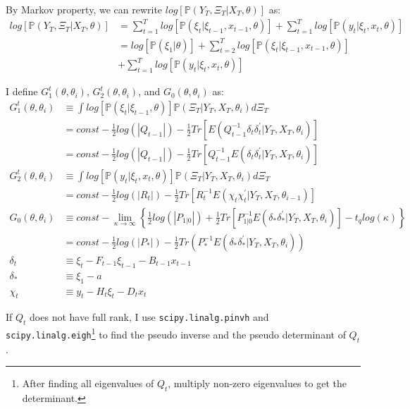 \documentclass[10pt]{article}
\numberwithin{equation}{section}
\begin{document}
By Markov property, we can rewrite $log[\mathbb{P}(Y_T,\Xi_T|X_T,\theta)]$ as:
\begin{align}
    log[\mathbb{P}(Y_T,\Xi_T|X_T,\theta)] &= \sum_{t=1}^{T}log[\mathbb{P}(\xi_t|\xi_{t-1},x_{t-1},\theta)] 
    + \sum_{t=1}^{T}log[\mathbb{P}(y_t|\xi_t,x_t,\theta)] \nonumber \\
    &= log[\mathbb{P}(\xi_1|\theta)] + \sum_{t=2}^{T}log[\mathbb{P}(\xi_t|\xi_{t-1},x_{t-1},\theta)] \nonumber \\ 
    &+ \sum_{t=1}^{T}log[\mathbb{P}(y_t|\xi_t,x_t,\theta)]\label{eq:log}
\end{align}

I define $G_1^{t}(\theta,\theta_i)$, $G_2^{t}(\theta,\theta_i)$, and $G_0(\theta,\theta_i)$ as:
\begin{align}
    G_1^{t}(\theta,\theta_{i}) &\equiv \int log[\mathbb{P}(\xi_t|\xi_{t-1},\theta)]\mathbb{P}(\Xi_T|Y_T,X_T,\theta_{i})d\Xi_T \nonumber \\
    &= const -\frac{1}{2}log(|Q_{t-1}|)-\frac{1}{2}Tr[E(Q_{t-1}^{-1}\delta_t\delta_t^{'}|Y_T,X_T,\theta_{i})] \nonumber \\
    &= const - \frac{1}{2}log(|Q_{t-1}|) - \frac{1}{2}Tr[Q_{t-1}^{-1}E(\delta_t\delta_t^{'}|Y_T,X_T,\theta_{i})] \label{eq:log1_trace} \\
    G_2^t(\theta,\theta_{i}) &\equiv \int log[\mathbb{P}(y_t|\xi_{t},x_t, \theta)]\mathbb{P}(\Xi_T|Y_T,X_T,\theta_{i})d\Xi_T \nonumber \\
    &= const - \frac{1}{2}log(|R_t|)-\frac{1}{2}Tr[R_t^{-1}E(\chi_t\chi_t^{'}|Y_T,X_T,\theta_{i-1})] \label{eq:log2_trace} \\
    G_0(\theta,\theta_{i}) &\equiv const - \lim_{\kappa\rightarrow\infty}\left\{\frac{1}{2}log(|P_{1|0}|) + \frac{1}{2}Tr[P_{1|0}^{-1}E(\delta_*\delta_*^{'}|Y_T, X_T, \theta_{i})] - t_qlog(\kappa)\right\} \nonumber \\
    &=const - \frac{1}{2}log(|P_*|)-\frac{1}{2}Tr(P_*^{-1}E(\delta_*\delta_*^{'}|Y_T, X_T, \theta_{i})) \\
    \delta_t &\equiv \xi_t - F_{t-1}\xi_{t-1} - B_{t-1}x_{t-1} \nonumber \\
    \delta_* &\equiv \xi_1 - a \nonumber \\
    \chi_t &\equiv y_t - H_t\xi_t - D_tx_t \nonumber
\end{align}

If $Q_t$ does not have full rank, I use \texttt{scipy.linalg.pinvh} and \texttt{scipy.linalg.eigh}\footnote{After finding all eigenvalues of $Q_t$, multiply non-zero eigenvalues to get the determinant.} to find the pseudo inverse and the pseudo determinant of $Q_t$.
\end{document}
